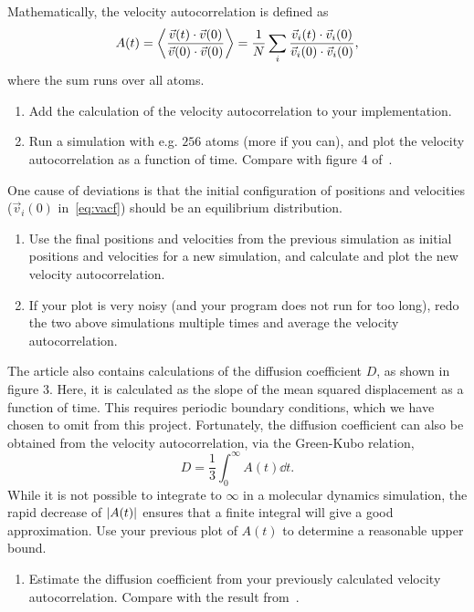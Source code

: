 \documentclass[11pt,british,a4paper]{report}
\begin{document}
Mathematically, the velocity autocorrelation is defined as
\begin{equation}
    A(t) = \ev{\frac{\vec{v}(t)\cdot\vec{v}(0)}{\vec{v}(0)\cdot\vec{v}(0)}}
         = \frac{1}{N} \sum_i \frac{\vec{v}_i(t)\cdot\vec{v}_i(0)}{\vec{v}_i(0)\cdot\vec{v}_i(0)},\label{eq:vacf}
\end{equation}
where the sum runs over all atoms.

\begin{enumerate}[label=\roman*.]
    \item Add the calculation of the velocity autocorrelation to your implementation.
    \item Run a simulation with e.g. \(256\) atoms (more if you can), and plot the velocity autocorrelation as a function of time. Compare with figure 4 of~\cite{Rahman_1964}.
\end{enumerate}

One cause of deviations is that the initial configuration of positions and velocities (\(\vec{v}_i(0)\) in~\vref{eq:vacf}) should be an equilibrium distribution.
\begin{enumerate}[label=\roman*.,resume]
    \item Use the final positions and velocities from the previous simulation as initial positions and velocities for a new simulation, and calculate and plot the new velocity autocorrelation.
    \item If your plot is very noisy (and your program does not run for too long), redo the two above simulations multiple times and average the velocity autocorrelation.
\end{enumerate}

The article also contains calculations of the diffusion coefficient \(D\), as shown in figure 3. Here, it is calculated as the slope of the mean squared displacement as a function of time. This requires periodic boundary conditions, which we have chosen to omit from this project. Fortunately, the diffusion coefficient can also be obtained from the velocity autocorrelation, via the Green-Kubo relation,
\[
    D = \frac{1}{3}\int_0^\infty A(t)\dd{t}.
\]
While it is not possible to integrate to \(\infty\) in a molecular dynamics simulation, the rapid decrease of \(\abs{A(t)}\) ensures that a finite integral will give a good approximation. Use your previous plot of \(A(t)\) to determine a reasonable upper bound.

\begin{enumerate}[label=\roman*.,resume]
    \item Estimate the diffusion coefficient from your previously calculated velocity autocorrelation. Compare with the result from~\cite{Rahman_1964}.
\end{enumerate}
\end{document}
